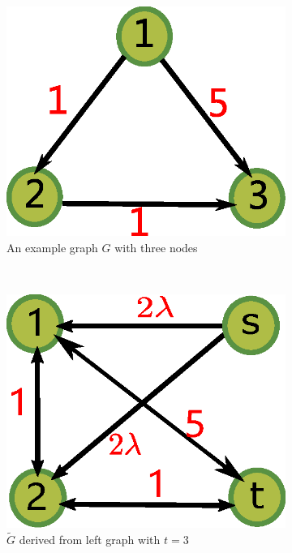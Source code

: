 \documentclass{article}
\begin{document}
\begin{figure}
	\centering
	\begin{subfigure}{0.4\textwidth}
		\includegraphics[width=\textwidth]{pic/example_directed.eps}
		\caption{An example graph $G$ with three nodes}\label{fig:tn}
	\end{subfigure}~
	\begin{subfigure}{0.4\textwidth}
		\includegraphics[width=\textwidth]{pic/example_st.eps}
		\caption{$\widetilde{G}$ derived from left graph with $t=3$}\label{fig:tn_converted}
	\end{subfigure}
	\caption{}
\end{figure}
\end{document}
